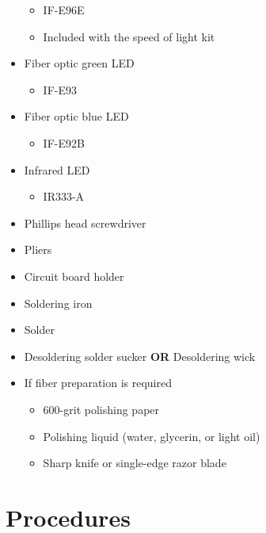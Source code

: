 \documentclass[12pt]{iopart} %
\begin{document}
\begin{itemize}
  \begin{itemize}
  \item
    IF-E96E
  \item
    Included with the speed of light kit
  \end{itemize}
\item
  Fiber optic green LED

  \begin{itemize}
  \item
    IF-E93
  \end{itemize}
\item
  Fiber optic blue LED

  \begin{itemize}
  \item
    IF-E92B
  \end{itemize}
\item
  Infrared LED

  \begin{itemize}
  \item
    IR333-A
  \end{itemize}
\item
  Phillips head screwdriver
\item
  Pliers
\item
  Circuit board holder
\item
  Soldering iron
\item
  Solder
\item
  Desoldering solder sucker \textbf{OR} Desoldering wick
\item
  If fiber preparation is required

  \begin{itemize}
  \item
    600-grit polishing paper
  \item
    Polishing liquid (water, glycerin, or light oil)
  \item
    Sharp knife or single-edge razor blade
  \end{itemize}
\end{itemize}

\section{Procedures}
\end{document}
